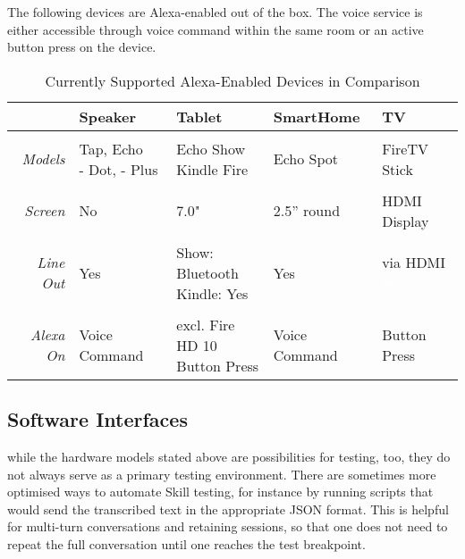 The following devices are Alexa-enabled out of the box. The voice service is either accessible through voice command within the same room or an active button press on the device.

\begin{table}[htbp!]
	\caption[Alexa Devices in Comparision]{Currently Supported Alexa-Enabled Devices in Comparison}\label{alexaDeviceTable}
	\begin{tabularx}{\textwidth}{  r | l l l l  }
		
				& Speaker							& Tablet	& SmartHome	& TV	\\ \hline \hline \\
		\textit{Models}	& \shortstack[l]{Tap, Echo \\ - Dot, - Plus}     & \shortstack[l]{Echo Show \\ Kindle Fire}    & Echo Spot & FireTV Stick \\ \hline \\
		\textit{Screen}  		& No      & 7.0" 		& 2.5'' round				&  HDMI Display      \\ \hline \\
		\textit{Line Out}		& Yes      					        & \shortstack[l]{Show: Bluetooth \\ Kindle: Yes} & 	Yes & \shortstack{via HDMI \\ \textcolor{white}{text} }      \\ \hline \\
		\textit{Alexa On} 	& Voice	Command					&
		\shortstack[l]{excl. Fire HD 10\\Button Press}
		& Voice Command & %
		Button Press
	\end{tabularx}
\end{table}





\subsection*{Software Interfaces}



while the hardware models stated above are possibilities for testing, too, they do not always serve as a primary testing environment. There are sometimes more optimised ways to automate Skill testing, for instance by running scripts that would send the transcribed text in the appropriate JSON format. This is helpful for multi-turn conversations and retaining sessions, so that one does not need to repeat the full conversation until one reaches the test breakpoint.

